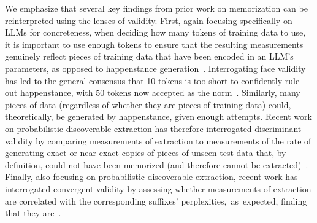 \documentclass{article}
\begin{document}
We emphasize that several key findings from prior work on memorization can be reinterpreted using the lenses of validity. First, again focusing specifically on LLMs for concreteness, when deciding how many tokens of training data to use, it is important to use enough tokens to ensure that the resulting measurements genuinely reflect pieces of training data that have been encoded in an LLM's parameters, as opposed to happenstance generation~\citep{carlini2021extracting,nasr2023scalable}. Interrogating face validity has led to the general consensus that 10 tokens is too short to confidently rule out happenstance, with 50 tokens now accepted as the norm~\citep{nasr2023scalable}. Similarly, many pieces of data (regardless of whether they are pieces of training data) could, theoretically, be generated by happenstance, given enough attempts. Recent work on probabilistic discoverable extraction has therefore interrogated discriminant validity by comparing measurements of extraction to measurements of the rate of generating exact or near-exact copies of pieces of unseen test data that, by definition, could not have been memorized (and therefore cannot be extracted)~\cite{hayes2025measuring}. Finally, also focusing on probabilistic discoverable extraction, recent work has interrogated convergent validity by assessing whether measurements of extraction are correlated with the corresponding suffixes' perplexities,~as~expected, finding that they are~\citep{hayes2025measuring}.
\end{document}
